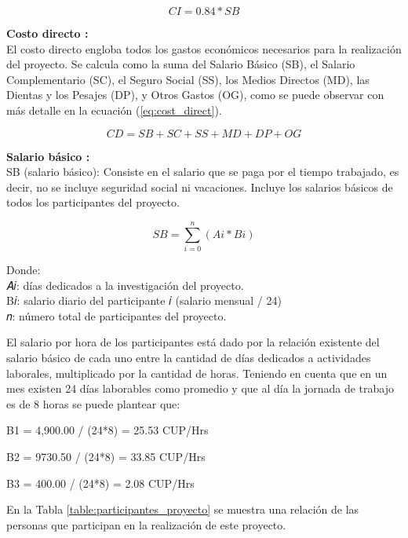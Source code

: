 \begin{equation}
    \label{eq:cost_indirect}
    CI = 0.84 * SB
\end{equation}

\textbf{Costo directo :}\\
El costo directo engloba todos los gastos económicos necesarios para la realización del proyecto. Se
calcula como la suma del Salario Básico (SB), el Salario Complementario (SC), el Seguro Social (SS), los
Medios Directos (MD), las Dientas y los Pesajes (DP), y Otros Gastos (OG), como se puede observar con más
detalle en la ecuación (\ref{eq:cost_direct}).

\begin{equation}
    \label{eq:cost_direct}
    CD = SB + SC + SS + MD + DP + OG
\end{equation}

\textbf{Salario básico :}\\
SB (salario básico): Consiste en el salario que se paga por el tiempo trabajado, es decir, no se incluye seguridad social ni vacaciones. Incluye los salarios básicos de todos los participantes del proyecto.


\begin{equation}
    \label{eq:sal_basico}
    SB = \sum_{i = 0}^{n} (Ai * Bi)
\end{equation}

Donde:\\
𝐴𝑖: días dedicados a la investigación del proyecto.\\
B𝑖: salario diario del participante 𝑖 (salario mensual / 24)\\
𝑛: número total de participantes del proyecto.

El salario por hora de los participantes está dado por la relación existente del salario
básico de cada uno entre la cantidad de días dedicados a actividades laborales,
multiplicado por la cantidad de horas. Teniendo en cuenta que en un mes existen 24
días laborables como promedio y que al día la jornada de trabajo es de 8 horas se
puede plantear que:

B1 = 4,900.00 / (24*8) = 25.53 CUP/Hrs

B2 = 9730.50 / (24*8) = 33.85 CUP/Hrs

B3 = 400.00 / (24*8) = 2.08 CUP/Hrs

En la Tabla \ref{table:participantes_proyecto} se muestra una relación de las personas que participan en la realización de este proyecto.

\vspace{2cm}

